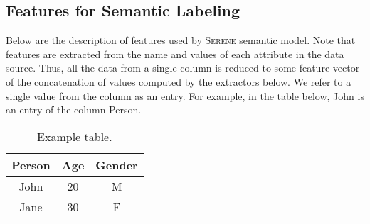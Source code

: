 \documentclass[letterpaper]{article} %
\newcommand{\serene}{\textsc{Serene}}
\begin{document}
\subsection{Features for Semantic Labeling\label{Ann:SemLab}}

Below are the description of features used by \serene{} semantic model.
Note that features are extracted from the name and values of each attribute in the data source.
Thus, all the data from a single column is reduced to some feature
vector of the concatenation of values computed by the extractors below.
We refer to a single value from the column as an entry. For example, in the table below, John is an entry of the column Person.

\begin{table}[!ht]\small
  \centering
  \caption{Example table.}
  	\begin{tabular}{ccc} 
  		\hline
		Person & Age & Gender \\
  		\hline
	    John & 20 & M\\
    	Jane & 30 & F\\
  		\hline
		\end{tabular} 
\end{table}
\end{document}
